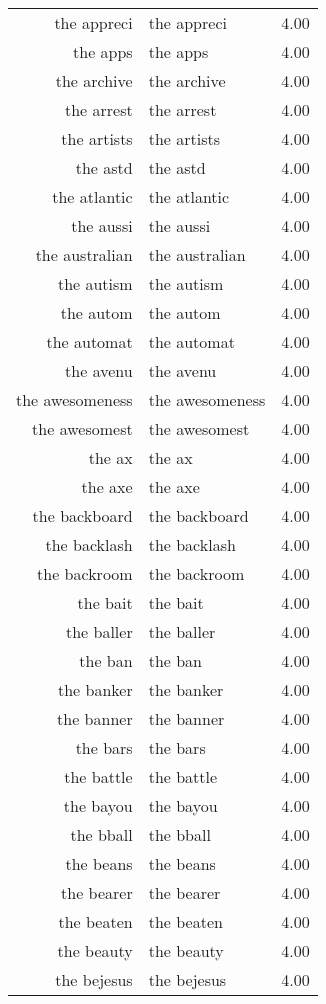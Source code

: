 \begin{table}[ht]
\begin{tabular}{rlr}
  the appreci & the appreci & 4.00 \\ 
  the apps & the apps & 4.00 \\ 
  the archive & the archive & 4.00 \\ 
  the arrest & the arrest & 4.00 \\ 
  the artists & the artists & 4.00 \\ 
  the astd & the astd & 4.00 \\ 
  the atlantic & the atlantic & 4.00 \\ 
  the aussi & the aussi & 4.00 \\ 
  the australian & the australian & 4.00 \\ 
  the autism & the autism & 4.00 \\ 
  the autom & the autom & 4.00 \\ 
  the automat & the automat & 4.00 \\ 
  the avenu & the avenu & 4.00 \\ 
  the awesomeness & the awesomeness & 4.00 \\ 
  the awesomest & the awesomest & 4.00 \\ 
  the ax & the ax & 4.00 \\ 
  the axe & the axe & 4.00 \\ 
  the backboard & the backboard & 4.00 \\ 
  the backlash & the backlash & 4.00 \\ 
  the backroom & the backroom & 4.00 \\ 
  the bait & the bait & 4.00 \\ 
  the baller & the baller & 4.00 \\ 
  the ban & the ban & 4.00 \\ 
  the banker & the banker & 4.00 \\ 
  the banner & the banner & 4.00 \\ 
  the bars & the bars & 4.00 \\ 
  the battle & the battle & 4.00 \\ 
  the bayou & the bayou & 4.00 \\ 
  the bball & the bball & 4.00 \\ 
  the beans & the beans & 4.00 \\ 
  the bearer & the bearer & 4.00 \\ 
  the beaten & the beaten & 4.00 \\ 
  the beauty & the beauty & 4.00 \\ 
  the bejesus & the bejesus & 4.00 \\ 

\end{tabular}
\end{table}
